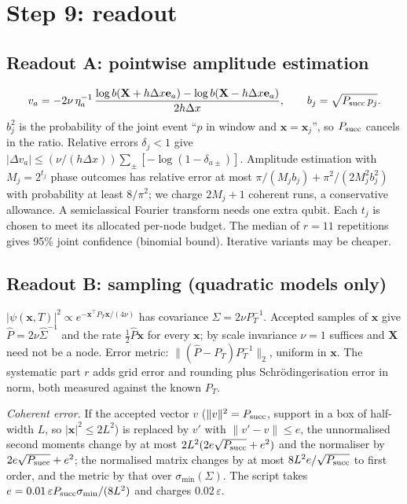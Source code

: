 \documentclass[11pt,a4paper]{article}
\newcommand{\x}{\mathbf x}
\begin{document}
\section{Step 9: readout}
\label{sec:stage9}

\subsection*{Readout A: pointwise amplitude estimation}

\begin{equation}
 v_a=-2\nu\,\eta_a^{-1}\,
 \frac{\log b(\mathbf X+h\Delta x\mathbf e_a)-\log b(\mathbf X-h\Delta x\mathbf e_a)}{2h\Delta x},
 \qquad b_j=\sqrt{P_{\rm succ}\,p_j}.
 \label{eq:readout}
\end{equation}
$b_j^2$ is the probability of the joint event ``$p$ in window and
$\mathbf x=\mathbf x_j$'', so $P_{\rm succ}$ cancels in the ratio. Relative
errors $\delta_j<1$ give
$|\Delta v_a|\le(\nu/(h\Delta x))\sum_\pm[-\log(1-\delta_{a\pm})]$.
Amplitude estimation \cite{brassard2002} with $M_j=2^{t_j}$ phase outcomes has relative
error at most $\pi/(M_jb_j)+\pi^2/(2M_j^2b_j^2)$ with probability at least
$8/\pi^2$; we charge $2M_j+1$ coherent runs, a conservative allowance.
A semiclassical Fourier transform
\cite{griffiths} needs one extra qubit. Each $t_j$ is chosen to meet its
allocated per-node budget. The median of $r=11$
repetitions gives 95\% joint confidence (binomial bound). Iterative variants
\cite{grinko2021} may be cheaper.

\subsection*{Readout B: sampling (quadratic models only)}

$|\psi(\mathbf x,T)|^2\propto e^{-\mathbf x^\top P_T\mathbf x/(4\nu)}$ has covariance
$\Sigma=2\nu P_T^{-1}$. Accepted samples of $\mathbf x$ give
$\hat P=2\nu\hat\Sigma^{-1}$ and the rate $\tfrac12\hat P\mathbf x$ for every
$\mathbf x$; by scale invariance $\nu=1$ suffices and $\mathbf X$ need not be a
node. Error metric: $\|(\hat P-P_T)P_T^{-1}\|_2$, uniform in $\mathbf x$. The
systematic part $r$ adds grid error and rounding plus Schr\"odingerisation
error in norm, both measured against the known $P_T$.

\emph{Coherent error.} If the accepted vector $v$ ($\|v\|^2=P_{\rm succ}$, support in a box of half-width $L$, so
$|\x|^2\le2L^2$) is replaced by $v'$ with $\|v'-v\|\le e$, the unnormalised second moments change by at most
$2L^2(2e\sqrt{P_{\rm succ}}+e^2)$ and the normaliser by $2e\sqrt{P_{\rm succ}}+e^2$; the normalised matrix changes by at most
$8L^2e/\sqrt{P_{\rm succ}}$ to first order, and the metric by that over $\sigma_{\min}(\Sigma)$. The script takes
$e=0.01\,\varepsilon P_{\rm succ}\sigma_{\min}/(8L^2)$ and charges $0.02\,\varepsilon$.
\end{document}
